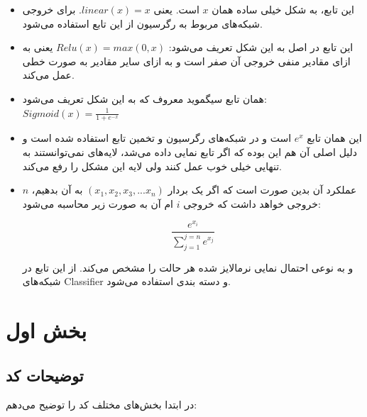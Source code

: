 \documentclass[12pt,titlepage,a4page , tikz , multi,table , svgnames,xcdraw]{article}
\begin{document}
\begin{itemize}

\item
{} این تابع، به شکل خیلی ساده همان $x$ است. یعنی $linear(x) = x$. برای خروجی شبکه‌های مربوط به رگرسیون از این تابع استفاده می‌شود.

\item
{} این تابع در اصل به این شکل تعریف می‌شود:
$Relu(x) = max(0,x)$
یعنی به ازای مقادیر منفی خروجی آن صفر است و به ازای سایر مقادیر به صورت خطی عمل می‌کند.

\item
{} همان تابع سیگموید معروف که به این شکل تعریف می‌شود:
$Sigmoid(x) = \frac{1}{1 + e^{-x}}$

\item
{} این همان تابع $e^x$ است و در شبکه‌های رگرسیون و تخمین تابع استفاده شده است و دلیل اصلی آن هم این بوده که اگر تابع نمایی داده می‌شد، لایه‌های  نمی‌توانستند به تنهایی خیلی خوب عمل کنند ولی لایه  این مشکل را رفع می‌کند.

\item
{}
عملکرد آن بدین صورت است که اگر یک بردار $(x_1 , x_2 , x_3 ,... x_n)$ به آن بدهیم، $n$ خروجی خواهد داشت که خروجی $i$ ام آن به صورت زیر محاسبه می‌شود:

$$\frac{e^{x_i}}{\sum_{j=1}^{j=n} e^{x_j}}$$

و به نوعی احتمال نمایی نرمالایز شده هر حالت را مشخص می‌کند. از این تابع در شبکه‌های Classifier و دسته بندی استفاده می‌شود.



\end{itemize}






\newpage

\section{بخش اول}

\subsection{توضیحات کد}
در ابتدا بخش‌های مختلف کد را توضیح می‌دهم:
\end{document}
